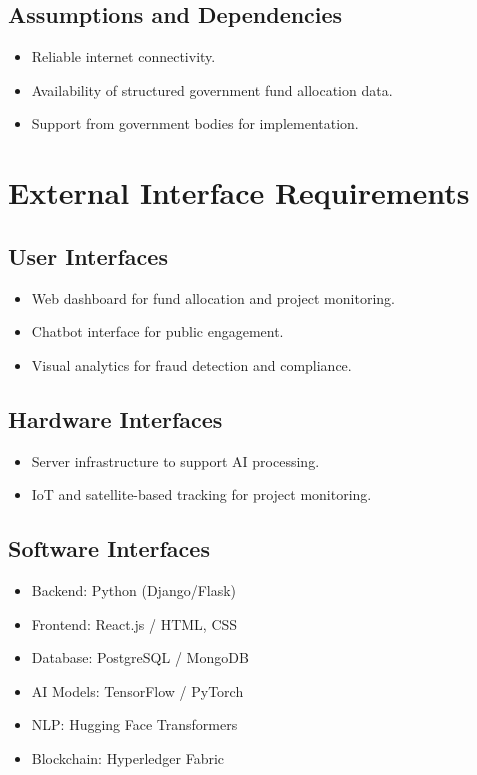 \documentclass{article}
\begin{document}
\subsection{Assumptions and Dependencies}
\begin{itemize}
    \item Reliable internet connectivity.
    \item Availability of structured government fund allocation data.
    \item Support from government bodies for implementation.
\end{itemize}

\newpage
\section{External Interface Requirements}
\subsection{User Interfaces}
\begin{itemize}
    \item Web dashboard for fund allocation and project monitoring.
    \item Chatbot interface for public engagement.
    \item Visual analytics for fraud detection and compliance.
\end{itemize}

\subsection{Hardware Interfaces}
\begin{itemize}
    \item Server infrastructure to support AI processing.
    \item IoT and satellite-based tracking for project monitoring.
\end{itemize}

\subsection{Software Interfaces}
\begin{itemize}
    \item Backend: Python (Django/Flask)
    \item Frontend: React.js / HTML, CSS
    \item Database: PostgreSQL / MongoDB
    \item AI Models: TensorFlow / PyTorch
    \item NLP: Hugging Face Transformers
    \item Blockchain: Hyperledger Fabric
\end{itemize}
\end{document}
